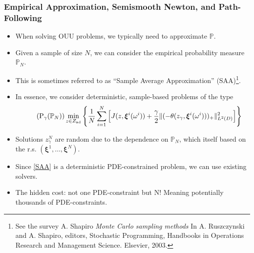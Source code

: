 \documentclass[aspectratio=169,xcolor=dvipsnames,11pt]{beamer}
\newcommand{\xibold}{\mathbold{\xi}}
\begin{document}
\begin{footnotesize}
\begin{frame}\frametitle{Empirical Approximation, Semismooth Newton, and Path-Following}
\begin{block}{}
\begin{itemize}
\item When solving OUU problems, we typically need to approximate $\mathbb P$.
\item Given a sample of size $N$, we can consider the empirical probability measure $\mathbb P_N$.
\item This is sometimes referred to as ``Sample Average Approximation'' (SAA)\footnote{\tiny See the survey A. Shapiro \textit{Monte Carlo sampling methods} In A. Ruszczynski and A. Shapiro, editors, Stochastic
Programming, Handbooks in Operations Research and Management Science. Elsevier, 2003.}.\pause
\item In essence, we consider \alert{deterministic}, \alert{sample-based} problems of the type
\begin{multline}\label{SAA}\tag{P$_{\gamma}(\mathbb P_N)$}
  \min_{z \in Z_{\rm ad}}
\left\{ 
\frac{1}{N} \sum_{i=1}^N\left[ J(z,\xibold^i(\omega^i)) +\frac{\gamma}{2} \| (-\theta(z_{\gamma},\xibold^i(\omega^i)))_+ \|^2_{L^2(D)}\right]
\right\}
\end{multline}
\item \pause Solutions $z^N_{\gamma}$ are \alert{random} due to the dependence on $\mathbb P_N$, which itself based on the r.s. $(\xibold^1,\dots,\xibold^N)$. 
\item \pause Since \eqref{SAA} is a deterministic PDE-constrained problem, we can use existing solvers.
\item  \pause The hidden cost: \alert{not one PDE-constraint but N}! Meaning potentially \alert{thousands of PDE-constraints}.
\end{itemize}
\end{block}
\end{frame}


\end{footnotesize}
\end{document}
